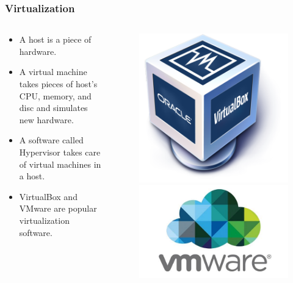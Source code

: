 \documentclass[aspectratio=169]{beamer}
\begin{document}
\begin{frame}
    \frametitle{Virtualization}
    \begin{columns}
        \begin{column}{0.5\textwidth}
            \begin{itemize}
                \item A host is a piece of hardware.
                \item A virtual machine takes pieces of host's CPU, memory, and
                    disc and simulates new hardware.
                \item A software called Hypervisor takes care of virtual
                    machines in a host.
                \item VirtualBox and VMware are popular virtualization 
                    software.
            \end{itemize}
        \end{column}
        \begin{column}{0.5\textwidth}
            \begin{figure}
                \centering
                \includegraphics[scale=0.2]{logos/virtualbox.png}
                \includegraphics[scale=0.2]{logos/vmware.jpg}

\end{figure}
\end{column}
\end{columns}
\end{frame}
\end{document}
